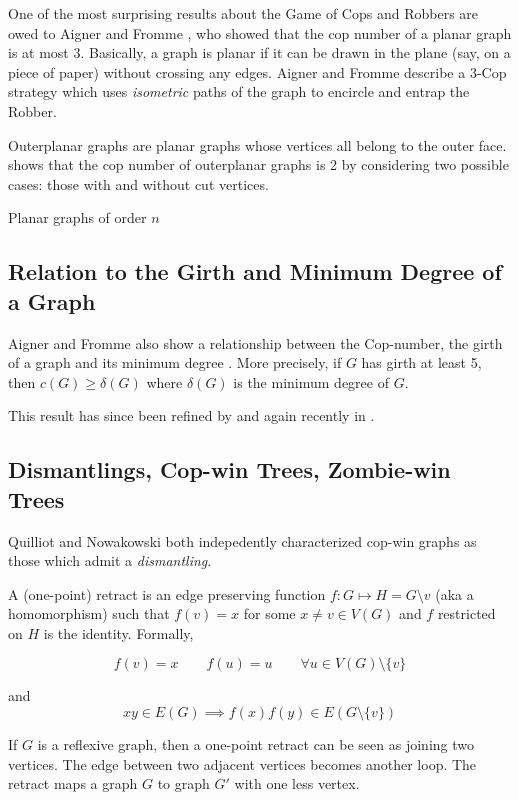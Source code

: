 One of the most surprising results about the Game of Cops and Robbers are owed to Aigner and Fromme \cite{aigner1984game}, who showed that the cop number of a planar graph is at most 3.
Basically, a graph is planar if it can be drawn in the plane (say, on a piece of paper) without crossing any edges. Aigner and Fromme describe a 3-Cop strategy which uses \textit{isometric} paths of the graph to encircle and entrap the Robber.

Outerplanar graphs are planar graphs whose vertices all belong to the outer face.  \cite{clarke2002constrained} shows that the cop number of outerplanar graphs is 2 by considering
two possible cases: those with and without cut vertices.

Planar graphs of order $n$ \cite{bonato2017topological}

\subsection{Relation to the Girth and Minimum Degree of a Graph}

Aigner and Fromme also show a relationship between the Cop-number, the girth of a graph and
its minimum degree \cite{aigner1984game}. More precisely, if $G$ has girth at least 5, then $c(G)\geq \delta(G)$ where $\delta(G)$ is the minimum degree of $G$.

This result has since been refined by \cite{} and again recently in \cite{}.


\subsection{Dismantlings, Cop-win Trees, Zombie-win Trees}

Quilliot and Nowakowski both indepedently characterized cop-win graphs as those which
admit a \textit{dismantling}.

A (one-point) retract is an edge preserving function $f : G \mapsto H = G \setminus v$
(aka a homomorphism) such that $f(v) = x$ for some $x \neq v \in V(G)$ and $f$ restricted on $H$ is the identity.
Formally,

\[ f(v) = x \qquad f(u) = u \qquad \forall u \in V(G)\setminus \{ v \} \]

and
\[ xy \in E(G) \implies f(x)f(y) \in E(G \setminus \{ v \}) \]

If $G$ is a reflexive graph, then a one-point retract can be seen as joining
two vertices. The edge between two adjacent vertices becomes another loop.
The retract maps a graph $G$ to graph $G'$ with one less vertex.


